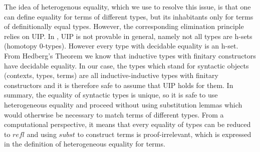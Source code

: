 \documentclass{acm_proc_article-sp}
\begin{document}
The idea of heterogenous equality, which we use to resolve this issue,
is that one can define equality for terms of different types, but its
inhabitants only for terms of definitionally equal types. However, the
corresponding elimination principle relies on UIP. 
In \itt{}, UIP is not provable in general,
  namely not all types are h-sets (homotopy 0-types). However every type with decidable equality is an h-set.
  From Hedberg's Theorem \cite{hed:98} we know that inductive
  types with finitary constructors have decidable equality. In our
  case, the types which stand for syntactic objects (contexts, types, terms)
  are all inductive-inductive types with finitary constructors and it is
  therefore safe to assume that UIP holds for them.
In summary, the equality of
syntactic types is unique, so it is safe to use heterogeneous equality
and proceed without using substitution lemmas which would otherwise be
necessary to match terms of different types. From a computational perspective, it means that every equality of types can be reduced to $\mathit{refl}$ and using $\mathit{subst}$ to construct terms is proof-irrelevant, which is expressed in the definition of heterogeneous equality for terms.
\end{document}
